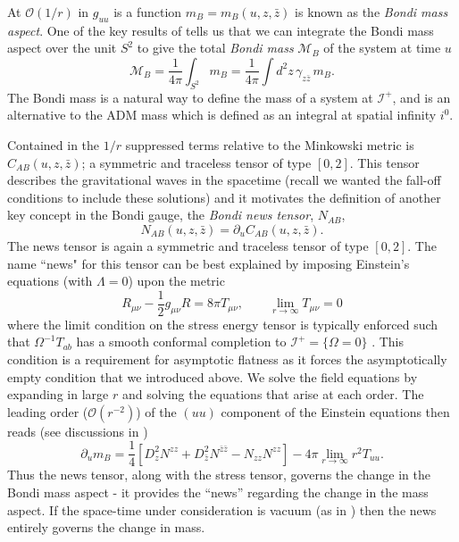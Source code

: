 \documentclass[a4paper,11pt]{article}
\numberwithin{equation}{section}
\begin{document}
At $\mathcal{O}(1/r)$ in $g_{uu}$ is a function $m_B=m_B(u,z,\bar{z})$ is known as the \textit{Bondi mass aspect}. One of the key results of \cite{Bondi:1962px} tells us that we can integrate the Bondi mass aspect over the unit $S^2$ to give the total \textit{Bondi mass} $\mathcal{M}_B$ of the system at time $u$ 
\begin{equation} \label{eq: Bondi_mass_time_u}
\mathcal{M}_B=\frac{1}{4\pi}\int_{S^2} m_B=\frac{1}{4\pi}\int d^2z \, \gamma_{z\bar{z}} \, m_B. 
\end{equation}
The Bondi mass is a natural way to define the mass of a system at $\mathscr{I^+}$, and is an alternative to the ADM mass which is defined as an integral at spatial infinity $i^0$.  

Contained in the $1/r$ suppressed terms relative to the Minkowski metric is $C_{AB}(u,z,\bar{z})$; a symmetric and traceless tensor of type $[0,2]$. This tensor describes the gravitational waves in the spacetime (recall we wanted the fall-off conditions to include these solutions) and it motivates the definition of another key concept in the Bondi gauge, the \textit{Bondi news tensor}, $N_{AB}$, 
\begin{equation}
N_{AB}(u,z,\bar{z})=\partial_{u}C_{AB}(u,z,\bar{z}).
\end{equation}
The news tensor is again a symmetric and traceless tensor of type $[0,2]$. The name ``news" for this tensor can be best explained by imposing Einstein's equations (with $\Lambda=0$) upon the metric 
\begin{equation}
R_{\mu \nu}-\frac{1}{2}g_{\mu \nu}R=8\pi T_{\mu \nu}, \qquad \lim_{r \rightarrow \infty} T_{\mu \nu} =0
\end{equation}
where the limit condition on the stress energy tensor is typically enforced such that $\Omega^{-1} T_{ab}$ has a smooth conformal completion to $\mathscr{I^+}= \{\Omega = 0\}$ \cite{Ashtekar:2014zfa}. This condition is a requirement for asymptotic flatness as it forces the asymptotically empty condition that we introduced above. We solve the field equations by expanding in large $r$ and solving the equations that arise at each order. The leading order ($\mathcal{O}(r^{-2})$) of the $(uu)$ component of the Einstein equations then reads (see discussions in \cite{Strominger:2017zoo,Flanagan:2015pxa}) 
\begin{equation}
\partial_u m_B=\frac{1}{4}[D^2_zN^{zz}+D^2_{\bar{z}}N^{\bar{z}\bar{z}}-N_{zz}N^{zz}]-4\pi  \lim_{r\rightarrow \infty} r^2T_{uu}.
\end{equation}
Thus the news tensor, along with the stress tensor, governs the change in the Bondi mass aspect - it provides the ``news'' regarding the change in the mass aspect. If the space-time under consideration is vacuum (as in \cite{Bondi:1962px}) then the news entirely governs the change in mass.
\end{document}

